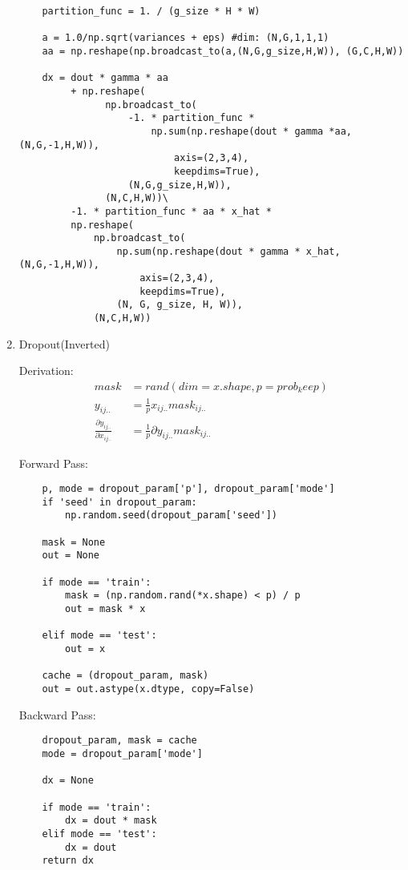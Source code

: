 \documentclass[12pt,letter]{article}
\begin{document}
\begin{enumerate}
\begin{verbatim}
    partition_func = 1. / (g_size * H * W)

    a = 1.0/np.sqrt(variances + eps) #dim: (N,G,1,1,1)
    aa = np.reshape(np.broadcast_to(a,(N,G,g_size,H,W)), (G,C,H,W))
    
    dx = dout * gamma * aa 
         + np.reshape( 
               np.broadcast_to(
                   -1. * partition_func * 
                       np.sum(np.reshape(dout * gamma *aa, (N,G,-1,H,W)),
                           axis=(2,3,4),
                           keepdims=True),
                   (N,G,g_size,H,W)), 
               (N,C,H,W))\
         -1. * partition_func * aa * x_hat * 
         np.reshape(
             np.broadcast_to(
                 np.sum(np.reshape(dout * gamma * x_hat, (N,G,-1,H,W)),
                     axis=(2,3,4), 
                     keepdims=True), 
                 (N, G, g_size, H, W)),
             (N,C,H,W))
\end{verbatim}

  \pagebreak
  
\item Dropout(Inverted)

  Derivation:
  \begin{align*}
    mask &= rand(dim=x.shape, p=prob_keep)\\
    y_{ij..} &= \frac{1}{p} x_{ij..} mask_{ij..}\\
    \frac{\partial y_{ij..}}{\partial x_{ij..}} &= \frac{1}{p} \partial y_{ij..} mask_{ij..}
  \end{align*}

  Forward Pass:
\begin{verbatim}
    p, mode = dropout_param['p'], dropout_param['mode']
    if 'seed' in dropout_param:
        np.random.seed(dropout_param['seed'])

    mask = None
    out = None
    
    if mode == 'train':
        mask = (np.random.rand(*x.shape) < p) / p
        out = mask * x

    elif mode == 'test':
        out = x

    cache = (dropout_param, mask)
    out = out.astype(x.dtype, copy=False)
\end{verbatim}

  Backward Pass:

\begin{verbatim}
    dropout_param, mask = cache
    mode = dropout_param['mode']

    dx = None

    if mode == 'train':
        dx = dout * mask
    elif mode == 'test':
        dx = dout
    return dx
\end{verbatim}


\end{enumerate}
\end{document}
